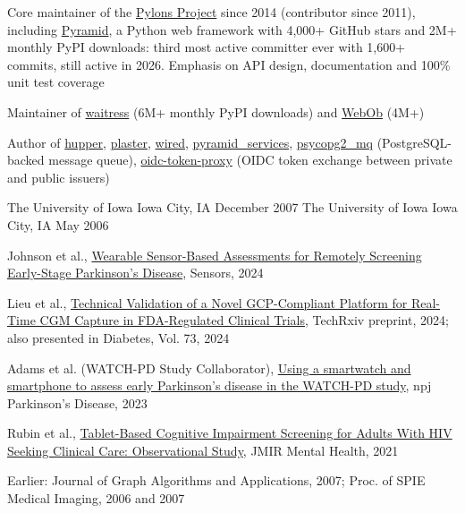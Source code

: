 \documentclass{resume}
\begin{document}
\begin{resumeItems}
\item Core maintainer of the \href{https://pylonsproject.org}{Pylons Project} since 2014 (contributor since 2011), including \href{https://github.com/Pylons/pyramid}{Pyramid}, a Python web framework with 4,000+ GitHub stars and 2M+ monthly PyPI downloads: third most active committer ever with 1,600+ commits, still active in 2026.
Emphasis on API design, documentation and 100\% unit test coverage
\item Maintainer of \href{https://github.com/Pylons/waitress}{waitress} (6M+ monthly PyPI downloads) and \href{https://github.com/Pylons/webob}{WebOb} (4M+)
\item Author of \href{https://github.com/Pylons/hupper}{hupper}, \href{https://github.com/Pylons/plaster}{plaster}, \href{https://github.com/mmerickel/wired}{wired}, \href{https://github.com/mmerickel/pyramid_services}{pyramid\_services}, \href{https://github.com/mmerickel/psycopg2_mq}{psycopg2\_mq} (PostgreSQL-backed message queue), \href{https://github.com/mmerickel/oidc-token-proxy}{oidc-token-proxy} (OIDC token exchange between private and public issuers)
\end{resumeItems}

            {The University of Iowa}
            {Iowa City, IA}
            {December 2007}
            {The University of Iowa}
            {Iowa City, IA}
            {May 2006}

\begin{resumeItems}
\item Johnson et al., \href{https://doi.org/10.3390/s24175637}{Wearable Sensor-Based Assessments for Remotely Screening Early-Stage Parkinson's Disease}, Sensors, 2024
\item Lieu et al., \href{https://doi.org/10.36227/techrxiv.172927312.24511423/v1}{Technical Validation of a Novel GCP-Compliant Platform for Real-Time CGM Capture in FDA-Regulated Clinical Trials}, TechRxiv preprint, 2024; also presented in Diabetes, Vol. 73, 2024
\item Adams et al. (WATCH-PD Study Collaborator), \href{https://doi.org/10.1038/s41531-023-00497-x}{Using a smartwatch and smartphone to assess early Parkinson's disease in the WATCH-PD study}, npj Parkinson's Disease, 2023
\item Rubin et al., \href{https://doi.org/10.2196/25660}{Tablet-Based Cognitive Impairment Screening for Adults With HIV Seeking Clinical Care: Observational Study}, JMIR Mental Health, 2021
\item Earlier: Journal of Graph Algorithms and Applications, 2007; Proc. of SPIE Medical Imaging, 2006 and 2007
\end{resumeItems}
\end{document}
